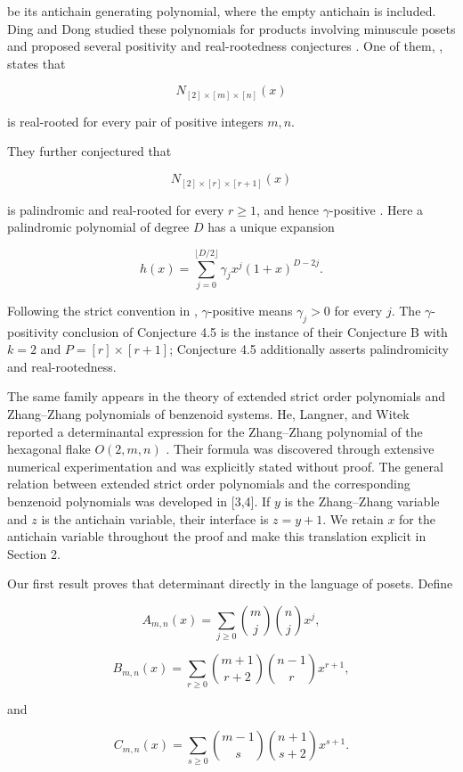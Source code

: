 \documentclass[11pt]{article}
\numberwithin{equation}{section}
\begin{document}
be its antichain generating polynomial, where the empty antichain is included.
Ding and Dong studied these polynomials for products involving minuscule posets
and proposed several positivity and real-rootedness conjectures \cite{ding2019}. One of them,
\cite[Conjecture~4.3]{ding2019}, states that

\nopagebreak[4]
\[
N_{[2]\times[m]\times[n]}(x)
\]

is real-rooted for every pair of positive integers $m,n$.

They further conjectured that

\nopagebreak[4]
\[
N_{[2]\times[r]\times[r+1]}(x)
\]

is palindromic and real-rooted for every $r\geq1$, and hence
$\gamma$-positive \cite[Conjecture~4.5]{ding2019}. Here a palindromic polynomial of degree
$D$ has a unique expansion

\nopagebreak[4]
\[
h(x)=\sum_{j=0}^{\lfloor D/2\rfloor}
\gamma_jx^j(1+x)^{D-2j}.
\tag{1.1}
\]

Following the strict convention in \cite{ding2019}, $\gamma$-positive means
$\gamma_j>0$ for every $j$. The $\gamma$-positivity conclusion of Conjecture
4.5 is the instance of their Conjecture B with $k=2$ and
$P=[r]\times[r+1]$; Conjecture 4.5 additionally asserts palindromicity and
real-rootedness.

The same family appears in the theory of extended strict order polynomials and
Zhang--Zhang polynomials of benzenoid systems. He, Langner, and Witek reported a
determinantal expression for the Zhang--Zhang polynomial of the hexagonal flake
$O(2,m,n)$ \cite{he2021}. Their formula was discovered through extensive numerical
experimentation and was explicitly stated without proof. The general relation
between extended strict order polynomials and the corresponding benzenoid
polynomials was developed in [3,4]. If $y$ is the Zhang--Zhang variable and $z$
is the antichain variable, their interface is $z=y+1$. We retain $x$ for the
antichain variable throughout the proof and make this translation explicit in
Section 2.

Our first result proves that determinant directly in the language of posets.
Define

\nopagebreak[4]
\[
A_{m,n}(x)=\sum_{j\geq0}\binom mj\binom njx^j,
\tag{1.2}
\]

\nopagebreak[4]
\[
B_{m,n}(x)=\sum_{r\geq0}
\binom{m+1}{r+2}\binom{n-1}{r}x^{r+1},
\tag{1.3}
\]

and

\nopagebreak[4]
\[
C_{m,n}(x)=\sum_{s\geq0}
\binom{m-1}{s}\binom{n+1}{s+2}x^{s+1}.
\tag{1.4}
\]
\end{document}
